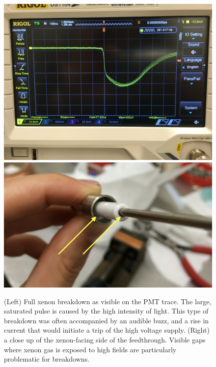 \begin{figure}[htbp]
\begin{center}
\includegraphics[width=\halffig]{figures/testbed/breakdown.jpg}
\includegraphics[width=\halffig]{figures/testbed/ft_1and2_gasgaps.png}

\caption{(Left) Full xenon breakdown as visible on the \ac{PMT} trace. The large, saturated pulse is caused by the high intensity of light. This type of breakdown was often accompanied by an audible buzz, and a rise in current that would initiate a trip of the high voltage supply. (Right) a close up of the xenon-facing side of the feedthrough. Visible gaps where xenon gas is exposed to high fields are particularly problematic for breakdowns.}
\label{fig:breakdown}
\end{center}
\end{figure}

